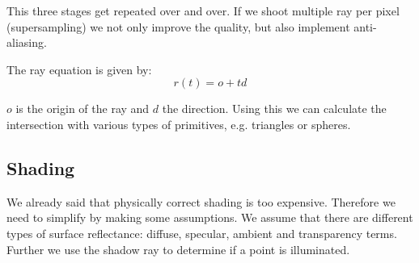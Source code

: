 This three stages get repeated over and over. If we shoot multiple ray per pixel (supersampling) we not only improve the quality, but also implement anti-aliasing. \medskip

The ray equation is given by:
$$r(t) = o + td$$

$o$ is the origin of the ray and $d$ the direction. Using this we can calculate the intersection with various types of primitives, e.g. triangles or spheres.

\subsection{Shading}

We already said that physically correct shading is too expensive. Therefore we need to simplify by making some assumptions. We assume that there are different types of surface reflectance: diffuse, specular, ambient and transparency terms. Further we use the shadow ray to determine if a point is illuminated.

